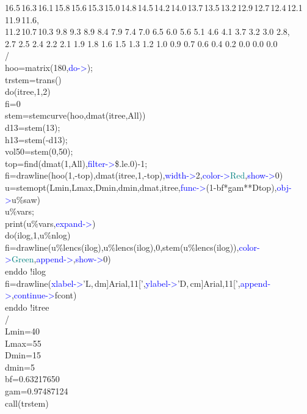 \begin{example}[stemoptex]
16.5\,16.3\,16.1\,15.8\,15.6\,15.3\,15.0\,14.8\,14.5\,14.2\,14.0\,13.7\,13.5\,13.2\,12.9\,12.7\,12.4\,12.1\,11.9\,11.6,\\ 
11.2\,10.7\,10.3\,\,9.8\,\,9.3\,\,8.9\,\,8.4\,\,7.9\,\,7.4\,\,7.0\,\,6.5\,\,6.0\,\,5.6\,\,5.1\,\,4.6\,\,4.1\,\,3.7\,\,3.2\,\,3.0\,\,2.8,\\ 
2.7\,\,2.5\,\,2.4\,\,2.2\,\,2.1\,\,1.9\,\,1.8\,\,1.6\,\,1.5\,\,1.3\,\,1.2\,\,1.0\,\,0.9\,\,0.7\,\,0.6\,\,0.4\,\,0.2\,\,0.0\,\,0.0\,\,0.0\\ 
/                                                                                                                                       \\ 
hoo=\textcolor{VioletRed}{matrix}(180,\textcolor{blue}{do->});\\ 
trstem=\textcolor{VioletRed}{trans}()\\ 
\textcolor{VioletRed}{do}(itree,1,2)\\ 
fi=0\\ 
stem=\textcolor{VioletRed}{stemcurve}(hoo,dmat(itree,All))\\ 
d13=stem(13);\\ 
h13=stem(-d13);\\ 
vol50=stem(0,50);\\ 
top=\textcolor{VioletRed}{find}(dmat(1,All),\textcolor{blue}{filter->}\$.le.0)-1;\\ 
fi=\textcolor{VioletRed}{drawline}(hoo(1,-top),dmat(itree,1,-top),\textcolor{blue}{width->}2,\textcolor{blue}{color->}\textcolor{teal}{Red},\textcolor{blue}{show->}0)\\ 
u=\textcolor{VioletRed}{stemopt}(Lmin,Lmax,Dmin,dmin,dmat,itree,\textcolor{blue}{func->}(1-bf*gam**Dtop),\textcolor{blue}{obj->}u\%saw)\\ 
u\%vars;\\ 
\textcolor{VioletRed}{print}(u\%vars,\textcolor{blue}{expand->})\\ 
\textcolor{VioletRed}{do}(ilog,1,u\%nlog)\\ 
fi=\textcolor{VioletRed}{drawline}(u\%lencs(ilog),u\%lencs(ilog),0,stem(u\%lencs(ilog)),\textcolor{blue}{color->}\textcolor{teal}{Green},\textcolor{blue}{append->},\textcolor{blue}{show->}0)\\ 
\textcolor{VioletRed}{enddo}\,\,{\color{ForestGreen}!ilog}\\ 
fi=\textcolor{VioletRed}{drawline}(\textcolor{blue}{xlabel->}'L,\,dm]Arial,11[',\textcolor{blue}{ylabel->}'D,\,cm]Arial,11[',\textcolor{blue}{append->},\textcolor{blue}{continue->}fcont)\\ 
\textcolor{VioletRed}{enddo}\,\,{\color{ForestGreen}!itree}\\ 
/                                                          \\ 
Lmin=40\\ 
Lmax=55\\ 
Dmin=15\\ 
dmin=5\\ 
bf=0.63217650\\ 
gam=0.97487124\\ 
\textcolor{VioletRed}{call}(trstem)\\ 
 
\end{example} 
